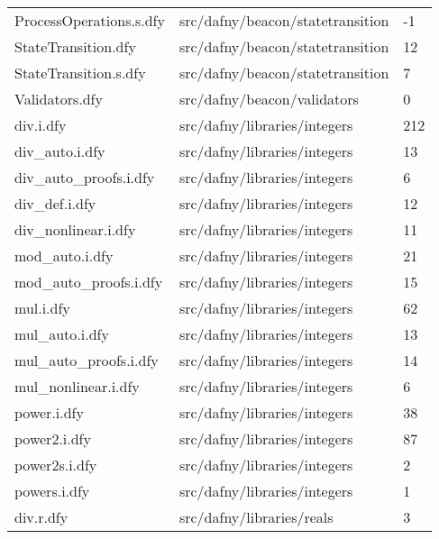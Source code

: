 \documentclass[a4paper, 12pt]{article}
\begin{document}
\begin{tabular}{lll}
         ProcessOperations.s.dfy &               src/dafny/beacon/statetransition &     -1 \\
             StateTransition.dfy &               src/dafny/beacon/statetransition &     12 \\
           StateTransition.s.dfy &               src/dafny/beacon/statetransition &      7 \\
                  Validators.dfy &                    src/dafny/beacon/validators &      0 \\
                       div.i.dfy &                   src/dafny/libraries/integers &    212 \\
                  div\_auto.i.dfy &                   src/dafny/libraries/integers &     13 \\
           div\_auto\_proofs.i.dfy &                   src/dafny/libraries/integers &      6 \\
                   div\_def.i.dfy &                   src/dafny/libraries/integers &     12 \\
             div\_nonlinear.i.dfy &                   src/dafny/libraries/integers &     11 \\
                  mod\_auto.i.dfy &                   src/dafny/libraries/integers &     21 \\
           mod\_auto\_proofs.i.dfy &                   src/dafny/libraries/integers &     15 \\
                       mul.i.dfy &                   src/dafny/libraries/integers &     62 \\
                  mul\_auto.i.dfy &                   src/dafny/libraries/integers &     13 \\
           mul\_auto\_proofs.i.dfy &                   src/dafny/libraries/integers &     14 \\
             mul\_nonlinear.i.dfy &                   src/dafny/libraries/integers &      6 \\
                     power.i.dfy &                   src/dafny/libraries/integers &     38 \\
                    power2.i.dfy &                   src/dafny/libraries/integers &     87 \\
                   power2s.i.dfy &                   src/dafny/libraries/integers &      2 \\
                    powers.i.dfy &                   src/dafny/libraries/integers &      1 \\
                       div.r.dfy &                      src/dafny/libraries/reals &      3 \\

\end{tabular}
\end{document}
